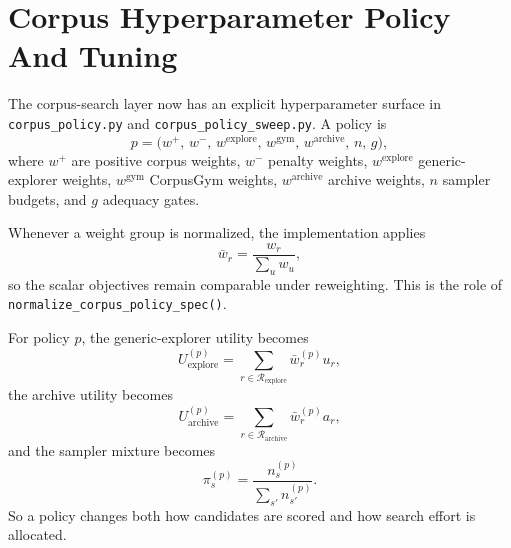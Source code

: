 \documentclass[11pt]{article}
\begin{document}
\section{Corpus Hyperparameter Policy And Tuning}

The corpus-search layer now has an explicit hyperparameter surface in
\texttt{corpus\_policy.py} and \texttt{corpus\_policy\_sweep.py}. A policy is
\begin{equation}
    p
    =
    \big(
        w^{+},\,
        w^{-},\,
        w^{\text{explore}},\,
        w^{\text{gym}},\,
        w^{\text{archive}},\,
        n,\,
        g
    \big),
\end{equation}
where \(w^{+}\) are positive corpus weights, \(w^{-}\) penalty weights,
\(w^{\text{explore}}\) generic-explorer weights,
\(w^{\text{gym}}\) CorpusGym weights, \(w^{\text{archive}}\) archive weights,
\(n\) sampler budgets, and \(g\) adequacy gates.

Whenever a weight group is normalized, the implementation applies
\begin{equation}
    \bar{w}_r
    =
    \frac{w_r}{\sum_u w_u},
\end{equation}
so the scalar objectives remain comparable under reweighting. This is the role
of \texttt{normalize\_corpus\_policy\_spec()}.

For policy \(p\), the generic-explorer utility becomes
\begin{equation}
    U_{\text{explore}}^{(p)}
    =
    \sum_{r \in \mathcal{R}_{\text{explore}}}
    \bar{w}^{(p)}_r u_r,
\end{equation}
the archive utility becomes
\begin{equation}
    U_{\text{archive}}^{(p)}
    =
    \sum_{r \in \mathcal{R}_{\text{archive}}}
    \bar{w}^{(p)}_r a_r,
\end{equation}
and the sampler mixture becomes
\begin{equation}
    \pi_s^{(p)}
    =
    \frac{n_s^{(p)}}{\sum_{s'} n_{s'}^{(p)}}.
\end{equation}
So a policy changes both how candidates are scored and how search effort is
allocated.
\end{document}

